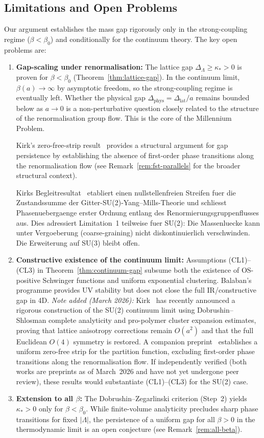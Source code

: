 \documentclass[12pt,a4paper]{article}
\theoremstyle{definition}
\theoremstyle{plain}
\theoremstyle{remark}
\begin{document}
\subsection{Limitations and Open Problems}

Our argument establishes the mass gap rigorously only in the strong-coupling regime ($\beta < \beta_0$) and conditionally for the continuum theory. The key open problems are:
\begin{enumerate}
    \item \textbf{Gap-scaling under renormalisation:} The lattice gap $\Delta_\Lambda \geq \kappa_* > 0$ is proven for $\beta < \beta_0$ (Theorem~\ref{thm:lattice-gap}). In the continuum limit, $\beta(a) \to \infty$ by asymptotic freedom, so the strong-coupling regime is eventually left. Whether the physical gap $\Delta_{\mathrm{phys}} = \Delta_{\mathrm{lat}}/a$ remains bounded below as $a \to 0$ is a non-perturbative question closely related to the structure of the renormalisation group flow. This is the core of the Millennium Problem.

    Kirk's zero-free-strip result~\cite{Kirk2026b} provides a structural argument for gap persistence by establishing the absence of first-order phase transitions along the renormalisation flow (see Remark~\ref{rem:fst-parallels} for the broader structural context).

    Kirks Begleitresultat~\cite{Kirk2026b} etabliert einen nullstellenfreien Streifen fuer die Zustandssumme der Gitter-SU(2)-Yang--Mills-Theorie und schliesst Phasenuebergaenge erster Ordnung entlang des Renormierungsgruppenflusses aus. Dies adressiert Limitation~1 teilweise fuer SU(2): Die Massenluecke kann unter Vergoeberung (coarse-graining) nicht diskontinuierlich verschwinden. Die Erweiterung auf SU(3) bleibt offen.
    \item \textbf{Constructive existence of the continuum limit:} Assumptions (CL1)--(CL3) in Theorem~\ref{thm:continuum-gap} subsume both the existence of OS-positive Schwinger functions and uniform exponential clustering. Balaban's programme provides UV stability but does not close the full IR/constructive gap in 4D. \emph{Note added (March 2026):} Kirk~\cite{Kirk2026} has recently announced a rigorous construction of the SU(2) continuum limit using Dobrushin--Shlosman complete analyticity and pro-polymer cluster expansion estimates, proving that lattice anisotropy corrections remain $O(a^2)$ and that the full Euclidean $O(4)$ symmetry is restored. A companion preprint~\cite{Kirk2026b} establishes a uniform zero-free strip for the partition function, excluding first-order phase transitions along the renormalisation flow. If independently verified (both works are preprints as of March~2026 and have not yet undergone peer review), these results would substantiate (CL1)--(CL3) for the SU(2) case.
    \item \textbf{Extension to all $\beta$:} The Dobrushin--Zegarlinski criterion (Step~2) yields $\kappa_* > 0$ only for $\beta < \beta_0$. While finite-volume analyticity precludes sharp phase transitions for fixed $|\Lambda|$, the persistence of a uniform gap for all $\beta > 0$ in the thermodynamic limit is an open conjecture (see Remark~\ref{rem:all-beta}).
\end{enumerate}
\end{document}
